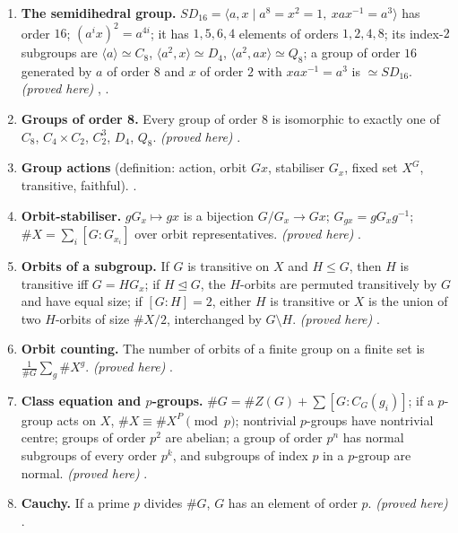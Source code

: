 \begin{enumerate}[label=\textbf{\thechapter.\arabic*}]
every subgroup is normal, $Q_8\not\simeq D_4$; a non-abelian group of order $8$ with a unique involution is $\simeq Q_8$. \emph{(proved
here)} , .
\item \textbf{The semidihedral group.} $SD_{16}=\langle a,x\mid a^8=x^2=1,\ xax^{-1}=a^3\rangle$ has order $16$; $(a^ix)^2=a^{4i}$; it has $1,5,6,4$
elements of orders $1,2,4,8$; its index-$2$ subgroups are $\langle a\rangle\simeq C_8$, $\langle a^2,x\rangle\simeq D_4$, $\langle a^2,ax\rangle\simeq Q_8$; a group of
order $16$ generated by $a$ of order $8$ and $x$ of order $2$ with $xax^{-1}=a^3$ is $\simeq SD_{16}$. \emph{(proved here)}
, .
\item \textbf{Groups of order 8.} Every group of order $8$ is isomorphic to exactly one of $C_8$, $C_4\times C_2$, $C_2^3$, $D_4$, $Q_8$.
\emph{(proved here)} .
\item \textbf{Group actions} (definition: action, orbit $Gx$, stabiliser $G_x$, fixed set $X^G$, transitive, faithful).
.
\item \textbf{Orbit-stabiliser.} $gG_x\mapsto gx$ is a bijection $G/G_x\to Gx$; $G_{gx}=gG_xg^{-1}$; $\#X=\sum_i[G:G_{x_i}]$ over orbit
representatives. \emph{(proved here)} .
\item \textbf{Orbits of a subgroup.} If $G$ is transitive on $X$ and $H\le G$, then $H$ is transitive iff $G=HG_x$; if $H\trianglelefteq G$, the $H$-orbits are
permuted transitively by $G$ and have equal size; if $[G:H]=2$, either $H$ is transitive or $X$ is the union of two $H$-orbits of
size $\#X/2$, interchanged by $G\setminus H$. \emph{(proved here)} .
\item \textbf{Orbit counting.} The number of orbits of a finite group on a finite set is $\frac1{\#G}\sum_g\#X^g$. \emph{(proved here)}
.
\item \textbf{Class equation and $p$-groups.} $\#G=\#Z(G)+\sum[G:C_G(g_i)]$; if a $p$-group acts on $X$, $\#X\equiv\#X^P\pmod p$; nontrivial
$p$-groups have nontrivial centre; groups of order $p^2$ are abelian; a group of order $p^n$ has normal subgroups of every order
$p^k$, and subgroups of index $p$ in a $p$-group are normal. \emph{(proved here)} .
\item \textbf{Cauchy.} If a prime $p$ divides $\#G$, $G$ has an element of order $p$. \emph{(proved here)} .

\end{enumerate}
